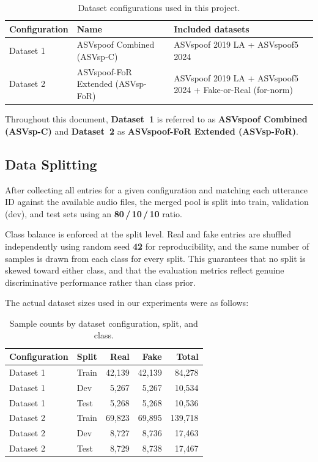 \documentclass[11pt,a4paper]{article}
\begin{document}
\begin{table}[htbp]
  \centering
  \caption{Dataset configurations used in this project.}
  \label{tab:datasets}
  \begin{tabular}{L{2.8cm}L{4.2cm}L{6.5cm}}
    \toprule
    Configuration & Name & Included datasets \\
    \midrule
    Dataset 1 & ASVspoof Combined (ASVsp-C) &
      ASVspoof 2019 LA + ASVspoof5 2024 \\[4pt]
    Dataset 2 & ASVspoof-FoR Extended (ASVsp-FoR) &
      ASVspoof 2019 LA + ASVspoof5 2024 + Fake-or-Real (for-norm) \\
    \bottomrule
  \end{tabular}
\end{table}

Throughout this document, \textbf{Dataset~1} is referred to as
\textbf{ASVspoof Combined (ASVsp-C)} and \textbf{Dataset~2} as
\textbf{ASVspoof-FoR Extended (ASVsp-FoR)}.

\subsection{Data Splitting}
\label{sec:splits}

After collecting all entries for a given configuration and matching each utterance
ID against the available audio files, the merged pool is split into train,
validation (dev), and test sets using an \textbf{80\,/\,10\,/\,10} ratio.

Class balance is enforced at the split level. Real and fake entries are shuffled
independently using random seed \textbf{42} for reproducibility, and the same
number of samples is drawn from each class for every split. This guarantees that
no split is skewed toward either class, and that the evaluation metrics reflect
genuine discriminative performance rather than class prior.

The actual dataset sizes used in our experiments were as follows:

\begin{table}[htbp]
  \centering
  \caption{Sample counts by dataset configuration, split, and class.}
  \label{tab:splits}
  \begin{tabular}{llrrr}
    \toprule
    Configuration & Split & Real & Fake & Total \\
    \midrule
    Dataset 1 & Train &  42,139 &  42,139 &  84,278 \\
    Dataset 1 & Dev   &   5,267 &   5,267 &  10,534 \\
    Dataset 1 & Test  &   5,268 &   5,268 &  10,536 \\
    \midrule
    Dataset 2 & Train &  69,823 &  69,895 & 139,718 \\
    Dataset 2 & Dev   &   8,727 &   8,736 &  17,463 \\
    Dataset 2 & Test  &   8,729 &   8,738 &  17,467 \\
    \bottomrule
  \end{tabular}
\end{table}
\end{document}

